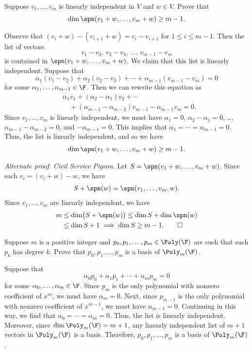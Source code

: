 \begin{exercise}
Suppose $v_1,\dots,v_m$ is linearly independent in $V$ and $w\in V$. Prove that
\[ \dim\spn(v_1+w,\dots,v_m+w) \ge m-1. \]
\end{exercise}
\begin{solution}
Observe that $(v_i+w)-(v_{i+1}+w)=v_i-v_{i+1}$ for $1\le i\le m-1$. Then the
list of vectors
\[ v_1-v_2,\,v_2-v_3,\,\dots,\,v_{m-1}-v_m \]
is contained in $\spn(v_1+w,\dots,v_m+w)$. We claim that this list is linearly
independent. Suppose that
\[ \alpha_1(v_1-v_2)+\alpha_2(v_2-v_3)+\cdots+\alpha_{m-1}(v_{m-1}-v_m) = 0 \]
for some $\alpha_1,\dots,\alpha_{m-1}\in\F$. Then we can rewrite this equation
as
\begin{align*}
&\alpha_1v_1+(\alpha_2-\alpha_1)v_2+\cdots\\
&\quad+(\alpha_{m-1}-\alpha_{m-2})v_{m-1}-\alpha_{m-1}v_m = 0.
\end{align*}
Since $v_1,\dots,v_m$ is linearly independent, we must have $\alpha_1=0$,
$\alpha_2-\alpha_1=0$, \dots, $\alpha_{m-1}-\alpha_{m-2}=0$, and
$-\alpha_{m-1}=0$. This implies that $\alpha_1=\cdots=\alpha_{m-1}=0$. Thus, the
list is linearly independent, and so we have
\[ \dim\spn(v_1+w,\dots,v_m+w) \ge m-1. \]

\emph{Alternate proof.} \emph{Civil Service Pigeon.} Let
$S=\spn(v_1+w,\dots,v_m+w)$. Since each $v_i=(v_i+w)-w$, we have
\[ S+\spn(w) = \spn(v_1,\dots,v_m,w). \]
Since $v_1,\dots,v_m$ are linearly independent, we have
\begin{align*}
m &\le \dim\bigl(S+\spn(w)\bigr) \le \dim S+\dim\spn(w)\\
  &\le \dim S+1 \implies \dim S\ge m-1. \qedhere
\end{align*}
\end{solution}

\begin{exercise}
Suppose $m$ is a positive integer and $p_0,p_1,\dots,p_m\in\Poly(\F)$ are such
that each $p_k$ has degree $k$. Prove that $p_0,p_1,\dots,p_m$ is a basis of
$\Poly_m(\F)$.
\end{exercise}
\begin{solution}
Suppose that
\[ \alpha_0p_0+\alpha_1p_1+\cdots+\alpha_mp_m = 0 \]
for some $\alpha_0,\dots,\alpha_m\in\F$. Since $p_m$ is the only polynomial with
nonzero coefficient of $x^m$, we must have $\alpha_m=0$. Next, since $p_{m-1}$
is the only polynomial with nonzero coefficient of $x^{m-1}$, we must have
$\alpha_{m-1}=0$. Continuing in this way, we find that
$\alpha_0=\cdots=\alpha_m=0$. Thus, the list is linearly independent. Moreover,
since $\dim\Poly_m(\F)=m+1$, any linearly independent list of $m+1$ vectors in
$\Poly_m(\F)$ is a basis. Therefore, $p_0,p_1,\dots,p_m$ is a basis of
$\Poly_m(\F)$.
\end{solution}


